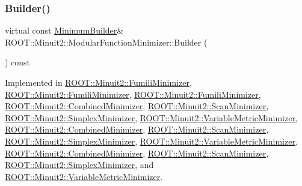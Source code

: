 \subsubsection{\texorpdfstring{Builder()}{Builder()}\hspace{0.1cm}{\footnotesize\ttfamily [3/3]}}
{\footnotesize\ttfamily virtual const \mbox{\hyperlink{classROOT_1_1Minuit2_1_1MinimumBuilder}{Minimum\+Builder}}\& R\+O\+O\+T\+::\+Minuit2\+::\+Modular\+Function\+Minimizer\+::\+Builder (\begin{DoxyParamCaption}{ }\end{DoxyParamCaption}) const\hspace{0.3cm}{\ttfamily [pure virtual]}}



Implemented in \mbox{\hyperlink{classROOT_1_1Minuit2_1_1FumiliMinimizer_a24d20e7cd4a335f60616fd7cafe0739c}{R\+O\+O\+T\+::\+Minuit2\+::\+Fumili\+Minimizer}}, \mbox{\hyperlink{classROOT_1_1Minuit2_1_1FumiliMinimizer_a24d20e7cd4a335f60616fd7cafe0739c}{R\+O\+O\+T\+::\+Minuit2\+::\+Fumili\+Minimizer}}, \mbox{\hyperlink{classROOT_1_1Minuit2_1_1FumiliMinimizer_a24d20e7cd4a335f60616fd7cafe0739c}{R\+O\+O\+T\+::\+Minuit2\+::\+Fumili\+Minimizer}}, \mbox{\hyperlink{classROOT_1_1Minuit2_1_1CombinedMinimizer_a73befc9c0bdfe8c9f09638505772c5ed}{R\+O\+O\+T\+::\+Minuit2\+::\+Combined\+Minimizer}}, \mbox{\hyperlink{classROOT_1_1Minuit2_1_1ScanMinimizer_a6ca4b63ec20ed8dd310e02d427ef05fa}{R\+O\+O\+T\+::\+Minuit2\+::\+Scan\+Minimizer}}, \mbox{\hyperlink{classROOT_1_1Minuit2_1_1SimplexMinimizer_a388494c3f9b45ce6c5d91decef737608}{R\+O\+O\+T\+::\+Minuit2\+::\+Simplex\+Minimizer}}, \mbox{\hyperlink{classROOT_1_1Minuit2_1_1VariableMetricMinimizer_aa31a52e431960a91acf0b9c2997b397b}{R\+O\+O\+T\+::\+Minuit2\+::\+Variable\+Metric\+Minimizer}}, \mbox{\hyperlink{classROOT_1_1Minuit2_1_1CombinedMinimizer_a73befc9c0bdfe8c9f09638505772c5ed}{R\+O\+O\+T\+::\+Minuit2\+::\+Combined\+Minimizer}}, \mbox{\hyperlink{classROOT_1_1Minuit2_1_1ScanMinimizer_a6ca4b63ec20ed8dd310e02d427ef05fa}{R\+O\+O\+T\+::\+Minuit2\+::\+Scan\+Minimizer}}, \mbox{\hyperlink{classROOT_1_1Minuit2_1_1SimplexMinimizer_a388494c3f9b45ce6c5d91decef737608}{R\+O\+O\+T\+::\+Minuit2\+::\+Simplex\+Minimizer}}, \mbox{\hyperlink{classROOT_1_1Minuit2_1_1VariableMetricMinimizer_aa31a52e431960a91acf0b9c2997b397b}{R\+O\+O\+T\+::\+Minuit2\+::\+Variable\+Metric\+Minimizer}}, \mbox{\hyperlink{classROOT_1_1Minuit2_1_1CombinedMinimizer_a73befc9c0bdfe8c9f09638505772c5ed}{R\+O\+O\+T\+::\+Minuit2\+::\+Combined\+Minimizer}}, \mbox{\hyperlink{classROOT_1_1Minuit2_1_1ScanMinimizer_a6ca4b63ec20ed8dd310e02d427ef05fa}{R\+O\+O\+T\+::\+Minuit2\+::\+Scan\+Minimizer}}, \mbox{\hyperlink{classROOT_1_1Minuit2_1_1SimplexMinimizer_a388494c3f9b45ce6c5d91decef737608}{R\+O\+O\+T\+::\+Minuit2\+::\+Simplex\+Minimizer}}, and \mbox{\hyperlink{classROOT_1_1Minuit2_1_1VariableMetricMinimizer_aa31a52e431960a91acf0b9c2997b397b}{R\+O\+O\+T\+::\+Minuit2\+::\+Variable\+Metric\+Minimizer}}.

